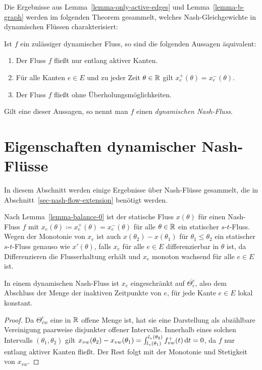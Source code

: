 Die Ergebnisse aus Lemma~\ref{lemma-only-active-edges} und Lemma~\ref{lemma-b-graph} werden im folgenden Theorem gesammelt, welches Nash-Gleichgewichte in dynamischen Flüssen charakterisiert:

\begin{theorem}\label{thm-equivalencies-nash-flow}
	Ist $f$ ein zu\-läs\-siger dynamischer Fluss, so sind die folgenden Aussagen äquivalent:
	\begin{enumerate}[label=(\roman*)]
		\item Der Fluss $f$ fließt nur entlang aktiver Kanten.
		\item Für alle Kanten $e\in E$ und zu jeder Zeit $\theta\in\mathbb{R}$ gilt $x_e^+(\theta) = x_e^-(\theta)$.
		\item Der Fluss $f$ fließt ohne Überholungsmöglichkeiten.
	\end{enumerate}
	Gilt eine dieser Aussagen, so nennt man $f$ einen \emph{dynamischen Nash-Fluss}.
\end{theorem}

\section{Eigenschaften dynamischer Nash-Flüsse}

In diesem Abschnitt werden einige Ergebnisse über Nash-Flüsse gesammelt, die in Abschnitt~\ref{sec-nash-flow-extension} benötigt werden.

\begin{remark}\label{remark-s-t-flow}
	Nach Lemma~\ref{lemma-balance-0} ist der statische Fluss $x(\theta)$ für einen Nash-Fluss $f$ mit $x_e(\theta)\coloneq x_e^+(\theta)=x_e^-(\theta)$ für alle $\theta\in\mathbb{R}$ ein statischer $s$-$t$-Fluss.
	Wegen der Monotonie von $x_e$ ist auch $x(\theta_2) - x(\theta_1)$ für $\theta_1 \leq \theta_2$ ein statischer $s$-$t$-Fluss genauso wie $x'(\theta)$, falls $x_e$ für alle $e\in E$ differenzierbar in $\theta$ ist, da Differenzieren die Flusserhaltung erhält und $x_e$ monoton wachsend für alle $e\in E$ ist.
\end{remark}

\begin{lemma}\label{lemma-x-locally-constant}
In einem dynamischen Nash-Fluss ist $x_e$ eingeschränkt auf $\overline{\Theta_e^c}$, also dem Abschluss der Menge der inaktiven Zeitpunkte von $e$, für jede Kante $e\in E$ lokal konstant.
\end{lemma}
\begin{proof}
Da $\Theta_{vw}^c$ eine in $\mathbb{R}$ offene Menge ist, hat sie eine Darstellung als abzählbare Vereinigung paarweise disjunkter offener Intervalle.
Innerhalb eines solchen Intervalls $(\theta_1, \theta_2)$ gilt $x_{vw}(\theta_2) - x_{vw}(\theta_1) = \int_{l_v(\theta_1)}^{l_v(\theta_2)} f_{vw}^+(t) \mathop{}\!\mathrm{d} t = 0$, da $f$ nur entlang aktiver Kanten fließt.
Der Rest folgt mit der Monotonie und Stetigkeit von $x_{vw}$.
\end{proof}


